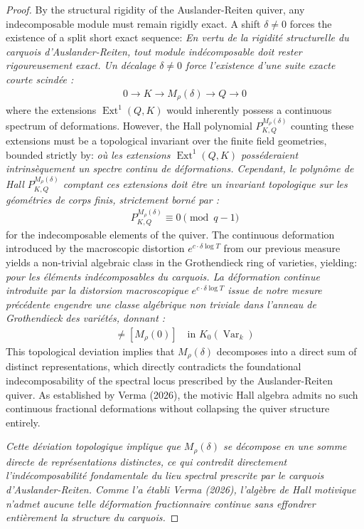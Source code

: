 \documentclass[11pt,a4paper]{article}
\theoremstyle{definition}
\begin{document}
\begin{proof}
By the structural rigidity of the Auslander-Reiten quiver, any indecomposable module must remain rigidly exact. A shift $\delta \neq 0$ forces the existence of a split short exact sequence:
\textit{En vertu de la rigidité structurelle du carquois d'Auslander-Reiten, tout module indécomposable doit rester rigoureusement exact. Un décalage $\delta \neq 0$ force l'existence d'une suite exacte courte scindée :}
\begin{align*}
0 \to K \to M_{\rho}(\delta) \to Q \to 0
\end{align*}
where the extensions $\operatorname{Ext}^1(Q, K)$ would inherently possess a continuous spectrum of deformations. However, the Hall polynomial $P_{K, Q}^{M_{\rho}(\delta)}$ counting these extensions must be a topological invariant over the finite field geometries, bounded strictly by:
\textit{où les extensions $\operatorname{Ext}^1(Q, K)$ posséderaient intrinsèquement un spectre continu de déformations. Cependant, le polynôme de Hall $P_{K, Q}^{M_{\rho}(\delta)}$ comptant ces extensions doit être un invariant topologique sur les géométries de corps finis, strictement borné par :}
\begin{align*}
P_{K, Q}^{M_{\rho}(\delta)} \equiv 0 \pmod{q-1}
\end{align*}
for the indecomposable elements of the quiver. The continuous deformation introduced by the macroscopic distortion $e^{c \cdot \delta \log T}$ from our previous measure yields a non-trivial algebraic class in the Grothendieck ring of varieties, yielding:
\textit{pour les éléments indécomposables du carquois. La déformation continue introduite par la distorsion macroscopique $e^{c \cdot \delta \log T}$ issue de notre mesure précédente engendre une classe algébrique non triviale dans l'anneau de Grothendieck des variétés, donnant :}
\begin{align*}
[M_{\rho}(\delta)] \neq [M_{\rho}(0)] \quad \text{in } K_0(\operatorname{Var}_k)
\end{align*}
This topological deviation implies that $M_{\rho}(\delta)$ decomposes into a direct sum of distinct representations, which directly contradicts the foundational indecomposability of the spectral locus prescribed by the Auslander-Reiten quiver. As established by Verma (2026), the motivic Hall algebra admits no such continuous fractional deformations without collapsing the quiver structure entirely.

\textit{Cette déviation topologique implique que $M_{\rho}(\delta)$ se décompose en une somme directe de représentations distinctes, ce qui contredit directement l'indécomposabilité fondamentale du lieu spectral prescrite par le carquois d'Auslander-Reiten. Comme l'a établi Verma (2026), l'algèbre de Hall motivique n'admet aucune telle déformation fractionnaire continue sans effondrer entièrement la structure du carquois.}


\end{proof}
\end{document}
